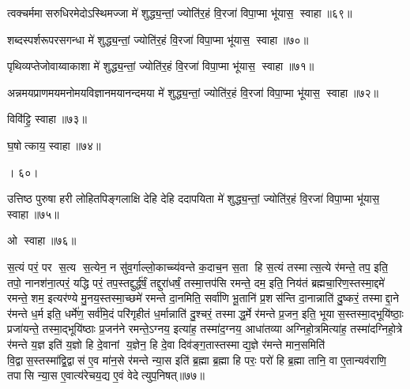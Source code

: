 त्वक्चर्ममासरुधिरमेदोऽस्थिमज्जा मे॑ शुद्ध्य॒न्तां॒ ज्योति॑र॒हं  वि॒रजा॑ विपा॒प्मा भू॑यास॒ स्वाहा॥६९॥
\anuvakamend


शब्दस्पर्शरूपरसगन्धा मे॑ शुद्ध्य॒न्तां॒ ज्योति॑र॒हं  वि॒रजा॑ विपा॒प्मा भू॑यास॒ स्वाहा॥७०॥
\anuvakamend


पृथिव्यप्तेजोवाय्वाकाशा मे॑ शुद्ध्य॒न्तां॒ ज्योति॑र॒हं  वि॒रजा॑ विपा॒प्मा भू॑यास॒ स्वाहा॥७१॥
\anuvakamend


अन्नमयप्राणमयमनोमयविज्ञानमयानन्दमया मे॑ शुद्ध्य॒न्तां॒ ज्योति॑र॒हं  वि॒रजा॑ विपा॒प्मा भू॑यास॒ स्वाहा॥७२॥
\anuvakamend


विवि॑ट्टि॒ स्वाहा॥७३॥
\anuvakamend


घ॒षोत्काय॒ स्वाहा॥७४॥

। ६०।
\anuvakamend


उत्तिष्ठ पुरुषा हरी लोहितपिङ्गलाक्षि देहि देहि ददापयिता मे॑ शुद्ध्य॒न्तां॒ ज्योति॑र॒हं  वि॒रजा॑ विपा॒प्मा भू॑यास॒ स्वाहा॥७५॥
\anuvakamend


ओ स्वाहा॥७६॥
\anuvakamend


स॒त्यं परं॒ पर स॒त्य स॒त्येन॒ न सु॑व॒र्गाल्लो॒काच्च्य॑वन्ते क॒दाच॒न स॒ता हि स॒त्यं तस्मात्स॒त्ये र॑मन्ते॒ तप॒ इति॒ तपो॒ नानश॑ना॒त्परं॒ यद्धि परं॒ तप॒स्तद्दुर्द्ध॑र्\mbox{}षं॒ तद्दुरा॑धर्\mbox{}षं॒ तस्मा॒त्तप॑सि रमन्ते॒ दम॒ इति॒ निय॑तं ब्रह्मचा॒रिण॒स्तस्मा॒द्दमे॑ रमन्ते॒ शम॒ इत्यर॑ण्ये मु॒नय॒स्तस्मा॒च्छमे॑ रमन्ते दा॒नमिति॒ सर्वा॑णि भू॒तानि॑ प्र॒शस॑न्ति दा॒नान्नाति॑ दु॒ष्करं॒ तस्माद्दा॒ने र॑मन्ते ध॒र्म इति॒ धर्मे॑ण॒ सर्व॑मि॒दं परि॑गृहीतं ध॒र्मान्नाति॑ दु॒श्चरं॒ तस्माद्ध॒र्मे र॑मन्ते प्र॒जन॒ इति॒ भूयास॒स्तस्मा॒द्भूयि॑ष्ठाः॒ प्रजा॑यन्ते॒ तस्मा॒द्भूयि॑ष्ठाः प्र॒जन॑ने रमन्ते॒ऽग्नय॒ इत्या॑ह॒ तस्मा॑द॒ग्नय॒ आधा॑तव्या अग्निहो॒त्रमित्या॑ह॒ तस्मा॑दग्निहो॒त्रे र॑मन्ते य॒ज्ञ इति॑ य॒ज्ञो हि दे॒वानां य॒ज्ञेन॒ हि दे॒वा दिव॑ङ्ग॒तास्तस्माद्य॒ज्ञे र॑मन्ते मान॒समिति॑ वि॒द्वास॒स्तस्मा॑द्वि॒द्वास॑ ए॒व मा॑न॒से र॑मन्ते न्या॒स इति॑ ब्र॒ह्मा ब्र॒ह्मा हि परः॒ परो॑ हि ब्र॒ह्मा तानि॒ वा ए॒तान्यव॑राणि॒ तपासि न्या॒स ए॒वात्य॑रेचय॒द्य ए॒वं वेदेत्युप॒निषत्॥७७॥
\anuvakamend


